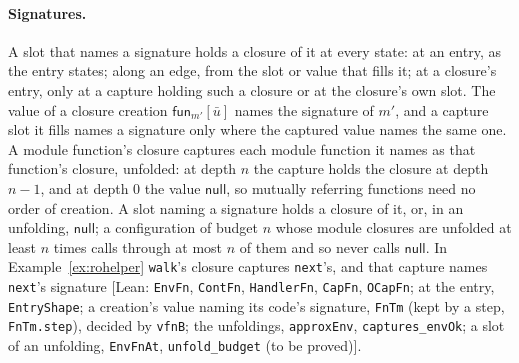 \documentclass[10pt,a4paper]{article}
\theoremstyle{definition}
\theoremstyle{remark}
\newcommand{\kw}[1]{\mathsf{#1}}
\newcommand{\code}[1]{\texttt{#1}}
\newcommand{\lean}[1]{\texttt{\small #1}}
\newcommand{\status}[1]{\textsf{\small[#1]}}
\begin{document}
\paragraph{Signatures.} A slot that names a signature holds a closure of
it at every state: at an entry, as the entry states; along an edge, from
the slot or value that fills it; at a closure's entry, only at a capture
holding such a closure or at the closure's own slot. The value of a
closure creation $\kw{fun}_{m'}[\bar u]$ names the signature of $m'$, and
a capture slot it fills names a signature only where the captured value
names the same one. A module function's closure captures each module
function it names as that function's closure, unfolded: at depth $n$ the
capture holds the closure at depth $n-1$, and at depth $0$ the value
$\kw{null}$, so mutually referring functions need no order of creation.
A slot naming a signature holds a closure of it, or, in an unfolding,
$\kw{null}$; a configuration of budget $n$ whose module closures are
unfolded at least $n$ times calls through at most $n$ of them and so
never calls $\kw{null}$. In Example~\ref{ex:rohelper} \code{walk}'s
closure captures \code{next}'s, and that capture names \code{next}'s
signature
\status{Lean: \lean{EnvFn}, \lean{ContFn}, \lean{HandlerFn}, \lean{CapFn}, \lean{OCapFn}; at the entry, \lean{EntryShape}; a creation's value naming its code's signature, \lean{FnTm} (kept by a step, \lean{FnTm.step}), decided by \lean{vfnB}; the unfoldings, \lean{approxEnv}, \lean{captures\_envOk}; a slot of an unfolding, \lean{EnvFnAt}, \lean{unfold\_budget} (to be proved)}.
\end{document}
